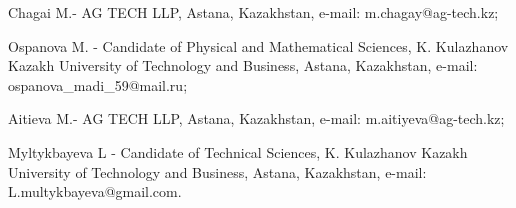 \begin{info}
Chagai M.- AG TECH LLP, Astana, Kazakhstan, e-mail:
m.chagay@ag-tech.kz;

Ospanova M. - Candidate of Physical and Mathematical Sciences, K.
Kulazhanov Kazakh University of Technology and Business, Astana,
Kazakhstan, e-mail: ospanova\_madi\_59@mail.ru;

Aitieva M.- AG TECH LLP, Astana, Kazakhstan, e-mail:
m.aitiyeva@ag-tech.kz;

Myltykbayeva L - Candidate of Technical Sciences, K. Kulazhanov Kazakh
University of Technology and Business, Astana, Kazakhstan, e-mail:
L.multykbayeva@gmail.com.
\end{info}
